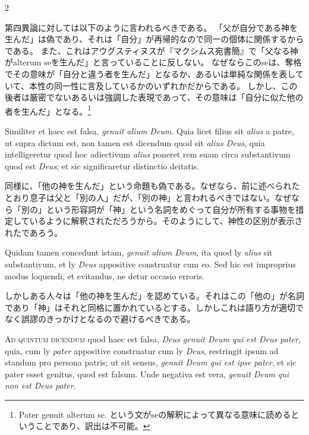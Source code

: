 \documentclass[paper=a4paper,fontsize=10pt,jafontsize=9pt,titlepage]{jlreq}
\begin{document}
\begin{paracol}{2}
\switchcolumn

第四異論に対しては以下のように言われるべきである。
「父が自分である神を生んだ」は偽であり、それは「自分」が再帰的なので同一の個体に関係するからである。
また、これはアウグスティヌスが『マクシムス宛書簡』で「父なる神がalterum
seを生んだ」と言っていることに反しない。
なぜならこのseは、奪格でその意味が「自分と違う者を生んだ」となるか、あるいは単純な関係を表していて、本性の同一性に言及しているかのいずれかだからである。
しかし、この後者は厳密でないあるいは強調した表現であって、その意味は「自分に似た他の者を生んだ」となる。\footnote{Pater
genuit alterum se.
という文がseの解釈によって異なる意味に読めるということであり、訳出は不可能。}

\switchcolumn*

Similiter et haec est falsa, \textit{genuit alium Deum}. Quia
licet filius sit \textit{alius} a patre, ut supra dictum est, non tamen est
dicendum quod sit \textit{alius Deus}, quia intelligeretur quod hoc adiectivum
\textit{alius} poneret rem suam circa substantivum quod est \textit{Deus}; et sic
significaretur distinctio deitatis.

\switchcolumn

同様に、「他の神を生んだ」という命題も偽である。なぜなら、前に述べられたとおり息子は父と「別の人」だが、「別の神」と言われるべきではない。なぜなら「別の」という形容詞が「神」という名詞をめぐって自分が所有する事物を措定しているように解釈されただろうから。そのようにして、神性の区別が表示されたであろう。

\switchcolumn*

Quidam tamen concedunt istam, \textit{genuit
alium Deum}, ita quod ly \textit{alius} sit substantivum, et ly \textit{Deus} appositive
construatur cum eo. Sed hic est improprius modus loquendi, et evitandus,
ne detur occasio erroris.

\switchcolumn

しかしある人々は「他の神を生んだ」を認めている。それはこの「他の」が名詞であり「神」はそれと同格に置かれているとする。しかしこれは語り方が適切でなく誤謬のきっかけとなるので避けるべきである。

\switchcolumn*

{\scshape Ad quintum dicendum} quod haec est falsa, \textit{Deus genuit Deum qui est Deus
pater}, quia, cum ly \textit{pater} appositive construatur cum ly \textit{Deus}, restringit
ipsum ad standum pro persona patris; ut sit sensus, \textit{genuit Deum qui est
ipse pater}, et sic pater esset genitus, quod est falsum. Unde negativa
est vera, \textit{genuit Deum qui non est Deus pater}.


\end{paracol}
\end{document}
